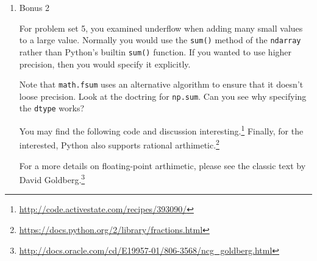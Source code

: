 \documentclass{article}
\begin{document}
\begin{enumerate}

\item Bonus 2

For problem set 5, you examined underflow when adding many small values to a
large value.  Normally you would use the \texttt{sum()} method of the
\texttt{ndarray} rather than Python's builtin \texttt{sum()} function.  If you
wanted to use higher precision, then you would specify it explicitly.


Note that \texttt{math.fsum} uses an alternative algorithm to ensure that it
doesn't loose precision.  Look at the doctring for \texttt{np.sum}.  Can you
see why specifying the \texttt{dtype} works?

You may find the following code and discussion interesting.\footnote{
\url{http://code.activestate.com/recipes/393090/}}
Finally, for the interested, Python also supports rational arthimetic.\footnote{
\url{https://docs.python.org/2/library/fractions.html}}

For a more details on floating-point arthimetic, please see the classic text by
David
Goldberg.\footnote{\url{http://docs.oracle.com/cd/E19957-01/806-3568/ncg_goldberg.html}}

\end{enumerate}
\end{document}
